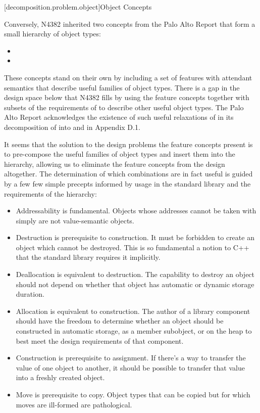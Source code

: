 [decomposition.problem.object]{Object Concepts}

\pnum
Conversely, N4382 inherited two concepts from the Palo Alto Report that form a small
hierarchy of object types:
\begin{itemize}
\item {}
\item {}
\end{itemize}
These concepts stand on their own by including a set of features with attendant semantics
that describe useful families of object types. There is a gap in the design space below
 that N4382 fills by using the feature concepts together with subsets
of the requirements of  to describe other useful object types. The Palo
Alto Report acknowledges the existence of such useful relaxations of  in
its decomposition of  into  and  in
Appendix D.1.

\pnum
It seems that the solution to the design problems the feature concepts present is to
pre-compose the useful families of object types and insert them into the 
hierarchy, allowing us to eliminate the feature concepts from the design altogether. The
determination of which combinations are in fact useful is guided by a few few simple precepts
informed by usage in the standard library and the requirements of the  hierarchy:
\begin{itemize}
\item Addressability is fundamental. Objects whose addresses cannot be taken with \tcode{\&}
simply are not value-semantic objects.
\item Destruction is prerequisite to construction. It must be forbidden to create an
object which cannot be destroyed. This is so fundamental a notion to C++ that the
standard library requires it implicitly.
\item Deallocation is equivalent to destruction. The capability to destroy an object should
not depend on whether that object has automatic or dynamic storage duration.
\item Allocation is equivalent to construction. The author of a library component should
have the freedom to determine whether an object should be constructed in automatic storage,
as a member subobject, or on the heap to best meet the design requirements of that component.
\item Construction is prerequisite to assignment. If there's a way to transfer the value
of one object to another, it should be possible to transfer that value into a freshly
created object.
\item Move is prerequisite to copy. Object types that can be copied but for which moves are
ill-formed are pathological.
\end{itemize}

